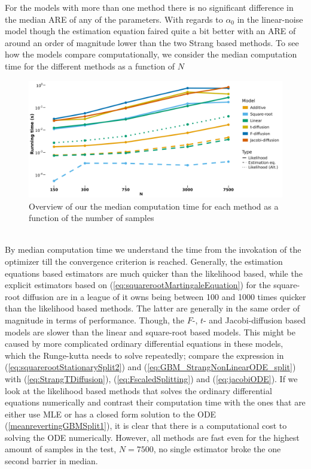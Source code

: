 For the models with more than one method there is no significant difference in the median ARE of any of the parameters. With regards to $\alpha_0$ in the linear-noise model though the estimation equation faired quite a bit better with an ARE of around an order of magnitude lower than the two Strang based methods. To see how the models compare computationally, we consider the median computation time for the different methods as a function of $N$
\begin{figure}[h]
    \begin{center}
    \includegraphics[scale = .1]{figures/estimation_duration_stationary.jpeg}
    \caption{Overview of our the median computation time for each method as a function of the number of samples}
    \label{figure:overviewOfDurationStationary}
    \end{center}
\end{figure}\\
By median computation time we understand the time from the invokation of the optimizer till the convergence criterion is reached. Generally, the estimation equations based estimators are much quicker than the likelihood based, while the explicit estimators based on (\ref{eq:squarerootMartingaleEquation}) for the square-root diffusion are in a league of it owns being between 100 and 1000 times quicker than the likelihood based methods. The latter are generally in the same order of magnitude in terms of performance. Though, the $F$-, $t$- and Jacobi-diffusion based models are slower than the linear and square-root based models. This might be caused by more complicated ordinary differential equations in these models, which the Runge-kutta needs to solve repeatedly; compare the expression in (\ref{eq:squarerootStationarySplit2}) and (\ref{eq:GBM_StrangNonLinearODE_split}) with (\ref{eq:StrangTDiffusion}), (\ref{eq:FscaledSplitting}) and (\ref{eq:jacobiODE}). If we look at the likelihood based methods that solves the ordinary differential equations numerically and contrast their computation time with the ones that are either use MLE or has a closed form solution to the ODE (\ref{meanrevertingGBMSplit1}), it is clear that there is a computational cost to solving the ODE numerically. However, all methods are fast even for the highest amount of samples in the test, $N = 7500$, no single estimator broke the one second barrier in median.
